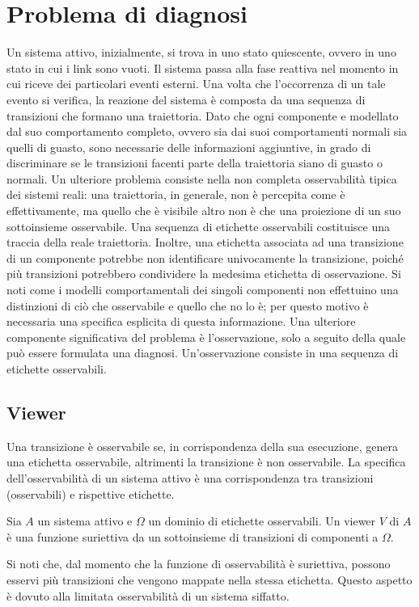 \section{Problema di diagnosi}
Un sistema attivo, inizialmente, si trova in uno stato quiescente, ovvero in uno stato in cui i link sono vuoti. Il sistema passa alla fase reattiva nel momento in cui riceve dei particolari eventi esterni. Una volta che l'occorrenza di un tale evento si verifica, la reazione del sistema è composta da una sequenza di transizioni che formano una traiettoria. Dato che ogni componente e modellato dal suo comportamento completo, ovvero sia dai suoi comportamenti normali sia quelli di guasto, sono necessarie delle informazioni aggiuntive, in grado di discriminare se le transizioni facenti parte della traiettoria siano di guasto o normali. Un ulteriore problema consiste nella non completa osservabilità tipica dei sistemi reali: una traiettoria, in generale, non è percepita come è effettivamente, ma quello che è visibile altro non è che una proiezione di un suo sottoinsieme osservabile. Una sequenza di etichette osservabili costituisce una traccia della reale traiettoria. Inoltre, una etichetta associata ad una transizione di un componente potrebbe non identificare univocamente la transizione, poiché più transizioni potrebbero condividere la medesima etichetta di osservazione. Si noti come i modelli comportamentali dei singoli componenti non effettuino una distinzioni di ciò che osservabile e quello che no lo è; per questo motivo è necessaria una specifica esplicita di questa informazione. Una ulteriore componente significativa del problema è l'osservazione, solo a seguito della quale può essere formulata una diagnosi. Un'osservazione consiste in una sequenza di etichette osservabili.

\subsection{Viewer}
Una transizione è osservabile se, in corrispondenza della sua esecuzione, genera una etichetta osservabile, altrimenti la transizione è non osservabile. La specifica dell'osservabilità di un sistema attivo è una corrispondenza tra transizioni (osservabili) e rispettive etichette.
\begin{defn}
Sia $A$ un sistema attivo e $\Omega$ un dominio di etichette osservabili. Un viewer $V$ di $A$ è una funzione suriettiva da un sottoinsieme di transizioni di componenti a $\Omega$.
\end{defn}
Si noti che, dal momento che la funzione di osservabilità è suriettiva, possono esservi più transizioni che vengono mappate nella stessa etichetta. Questo aspetto è dovuto alla limitata osservabilità di un sistema siffatto.

